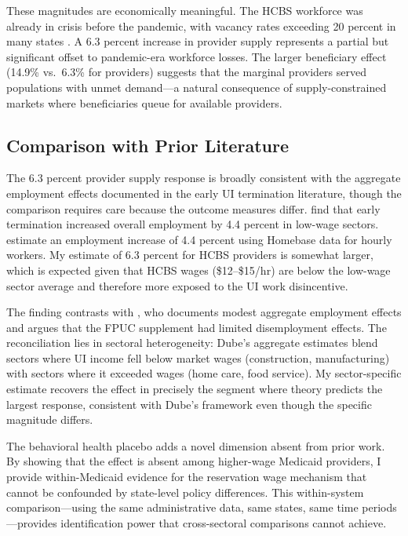 \documentclass[12pt]{article}
\begin{document}
These magnitudes are economically meaningful. The HCBS workforce was already in crisis before the pandemic, with vacancy rates exceeding 20 percent in many states \citep{phi2021}. A 6.3 percent increase in provider supply represents a partial but significant offset to pandemic-era workforce losses. The larger beneficiary effect (14.9\% vs.\ 6.3\% for providers) suggests that the marginal providers served populations with unmet demand---a natural consequence of supply-constrained markets where beneficiaries queue for available providers.

\subsection{Comparison with Prior Literature}

The 6.3 percent provider supply response is broadly consistent with the aggregate employment effects documented in the early UI termination literature, though the comparison requires care because the outcome measures differ. \citet{holzer2021} find that early termination increased overall employment by 4.4 percent in low-wage sectors. \citet{coombs2022} estimate an employment increase of 4.4 percent using Homebase data for hourly workers. My estimate of 6.3 percent for HCBS providers is somewhat larger, which is expected given that HCBS wages (\$12--\$15/hr) are below the low-wage sector average and therefore more exposed to the UI work disincentive.

The finding contrasts with \citet{dube2021}, who documents modest aggregate employment effects and argues that the FPUC supplement had limited disemployment effects. The reconciliation lies in sectoral heterogeneity: Dube's aggregate estimates blend sectors where UI income fell below market wages (construction, manufacturing) with sectors where it exceeded wages (home care, food service). My sector-specific estimate recovers the effect in precisely the segment where theory predicts the largest response, consistent with Dube's framework even though the specific magnitude differs.

The behavioral health placebo adds a novel dimension absent from prior work. By showing that the effect is absent among higher-wage Medicaid providers, I provide within-Medicaid evidence for the reservation wage mechanism that cannot be confounded by state-level policy differences. This within-system comparison---using the same administrative data, same states, same time periods---provides identification power that cross-sectoral comparisons cannot achieve.
\end{document}
